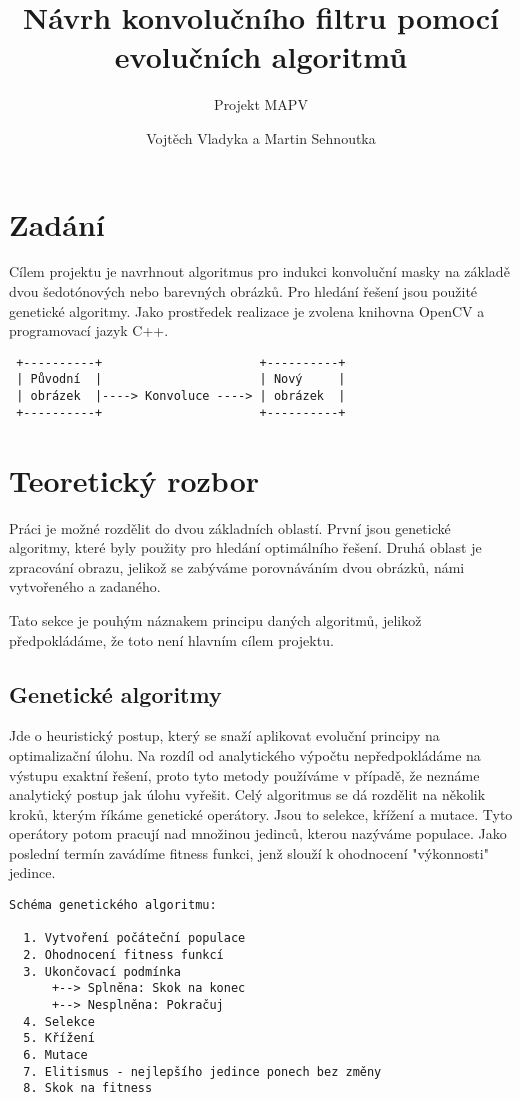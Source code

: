 \documentclass[a4paper,11pt]{scrartcl}
\title{Návrh konvolučního filtru pomocí evolučních algoritmů}
\subtitle{Projekt MAPV}
\author{Vojtěch Vladyka a Martin Sehnoutka}
\begin{document}
\maketitle
\tableofcontents

\section{Zadání}
Cílem projektu je navrhnout algoritmus pro indukci konvoluční masky na základě dvou šedotónových nebo barevných obrázků. Pro hledání řešení jsou použité genetické algoritmy. Jako prostředek realizace je zvolena knihovna OpenCV a programovací jazyk C++.

\begin{verbatim}
 +----------+                      +----------+
 | Původní  |                      | Nový     |
 | obrázek  |----> Konvoluce ----> | obrázek  |
 +----------+                      +----------+
\end{verbatim}

\section{Teoretický rozbor}

Práci je možné rozdělit do dvou základních oblastí. První jsou genetické algoritmy, které byly použity pro hledání optimálního řešení. Druhá oblast je zpracování obrazu, jelikož se zabýváme porovnáváním dvou obrázků, námi vytvořeného a zadaného.

Tato sekce je pouhým náznakem principu daných algoritmů, jelikož předpokládáme, že toto není hlavním cílem projektu.

\subsection{Genetické algoritmy}

Jde o heuristický postup, který se snaží aplikovat evoluční principy na optimalizační úlohu. Na rozdíl od analytického výpočtu nepředpokládáme na výstupu exaktní řešení, proto tyto metody používáme v případě, že neznáme analytický postup jak úlohu vyřešit. Celý algoritmus se dá rozdělit na několik kroků, kterým říkáme genetické operátory. Jsou to selekce, křížení a mutace. Tyto operátory potom pracují nad množinou jedinců, kterou nazýváme populace. Jako poslední termín zavádíme fitness funkci, jenž slouží k ohodnocení "výkonnosti" jedince.

\begin{verbatim}
Schéma genetického algoritmu:

  1. Vytvoření počáteční populace
  2. Ohodnocení fitness funkcí
  3. Ukončovací podmínka
      +--> Splněna: Skok na konec 
      +--> Nesplněna: Pokračuj
  4. Selekce
  5. Křížení
  6. Mutace
  7. Elitismus - nejlepšího jedince ponech bez změny
  8. Skok na fitness
\end{verbatim}
\end{document}
